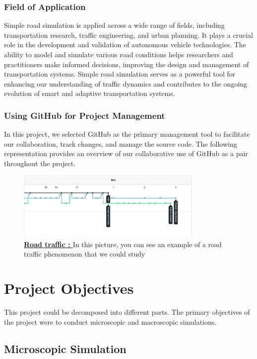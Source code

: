 \documentclass{article}
\begin{document}
		\subsubsection{Field of Application}
		Simple road simulation is applied across a wide range of fields, including transportation research, traffic engineering, and urban planning. It plays a crucial role in the development and validation of autonomous vehicle technologies. The ability to model and simulate various road conditions helps researchers and practitioners make informed decisions, improving the design and management of transportation systems. Simple road simulation serves as a powerful tool for enhancing our understanding of traffic dynamics and contributes to the ongoing evolution of smart and adaptive transportation systems.
		
	
	\subsubsection{Using GitHub for Project Management}
	In this project, we selected GitHub as the primary management tool to facilitate our collaboration, track changes, and manage the source code. The following representation provides an overview of our collaborative use of GitHub as a pair throughout the project.
	\begin{figure}[H]
		\centering
		\includegraphics[width=0.8\textwidth]{GitHub.jpg}
		\caption{\textbf{\underline{Road traffic : }} In this picture, you can see an example of a road traffic phenomenon that we could study}
		\label{fig:GitHub}
	\end{figure}
	
	\section{Project Objectives}
	
	This project could be decomposed into different parts. The primary objectives of the project were to conduct microscopic and macroscopic simulations.
	
	\subsection{Microscopic Simulation}
	
\end{document}
